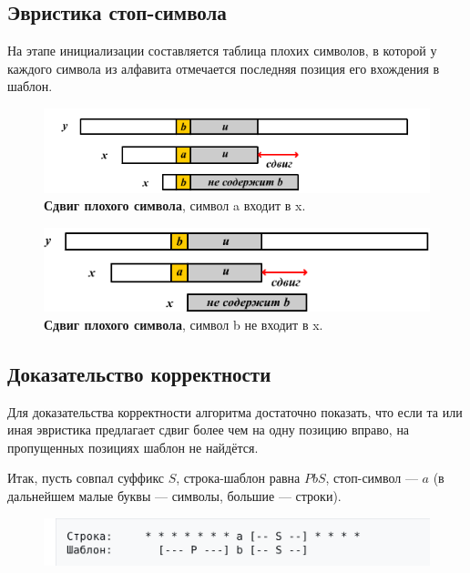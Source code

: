 \subsection{Эвристика стоп-символа}

На этапе инициализации составляется таблица плохих символов, в которой у каждого символа из алфавита отмечается последняя позиция его вхождения в шаблон.


\begin{figure}[h!]
	\centering
	\includegraphics[width=0.7\linewidth]{img/10_3.png}
	\captionsetup{labelformat=empty}
	\caption{\textbf{Сдвиг плохого символа}, символ a входит в x.}
\end{figure}

\begin{figure}[h!]
	\centering
	\includegraphics[width=0.7\linewidth]{img/10_4.png}
	\captionsetup{labelformat=empty}
	\caption{\textbf{Сдвиг плохого символа}, символ b не входит в x.}
\end{figure}


\subsection*{Доказательство корректности}

Для доказательства корректности алгоритма достаточно показать, что если та или иная эвристика предлагает сдвиг более чем на одну позицию вправо, на пропущенных позициях шаблон не найдётся.

Итак, пусть совпал суффикс $S$, строка-шаблон равна $PbS$, стоп-символ — $a$ (в дальнейшем малые буквы — символы, большие — строки).

\begin{figure}[h!]
	\centering
	\includegraphics[width=0.7\linewidth]{img/10_5.png}
	\captionsetup{labelformat=empty}
	\caption{\textbf{}}
\end{figure}

